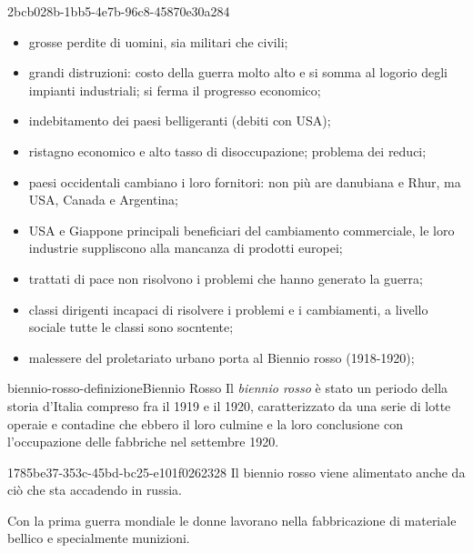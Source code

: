 \documentclass[preview]{standalone}
\begin{document}
\begin{snippet}{2bcb028b-1bb5-4e7b-96c8-45870e30a284}
    \begin{itemize}
        \item grosse perdite di uomini, sia militari che civili;
        \item grandi distruzioni: costo della guerra molto alto e si somma al logorio
            degli impianti industriali; si ferma il progresso economico;
        \item indebitamento dei paesi belligeranti (debiti con USA);
        \item ristagno economico e alto tasso di disoccupazione; problema dei reduci;
        \item paesi occidentali cambiano i loro fornitori: non più are danubiana
            e Rhur, ma USA, Canada e Argentina;
        \item USA e Giappone principali beneficiari del cambiamento
            commerciale, le loro industrie suppliscono alla mancanza di prodotti europei;
        \item trattati di pace non risolvono i problemi che hanno generato la guerra;
        \item classi dirigenti incapaci di risolvere i problemi e i cambiamenti,
            a livello sociale tutte le classi sono socntente;
        \item malessere del proletariato urbano porta al Biennio rosso (1918-1920);
    \end{itemize}
\end{snippet}

\begin{snippetdefinition}{biennio-rosso-definizione}{Biennio Rosso}
    Il \textit{biennio rosso} 
    è stato un periodo
    della storia d'Italia compreso fra il
    1919 e il 1920, caratterizzato da una serie
    di lotte operaie e contadine che ebbero il
    loro culmine e la loro conclusione con
    l'occupazione delle fabbriche nel settembre 1920.
\end{snippetdefinition}

\begin{snippet}{1785be37-353c-45bd-bc25-e101f0262328}
    Il biennio rosso viene alimentato anche da ciò che sta accadendo in russia.

    Con la prima guerra mondiale le donne lavorano nella fabbricazione di materiale bellico e 
    specialmente munizioni.
\end{snippet}
\end{document}
